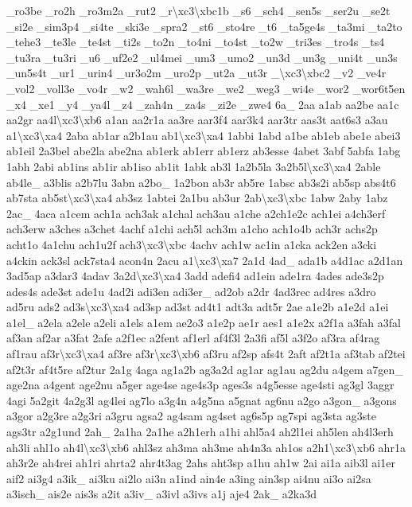 \begin{DoxyCompactItemize}
\-\_\-ro3be \-\_\-ro2h \-\_\-ro3m2a \-\_\-rut2 \-\_\-r\textbackslash{}xc3\textbackslash{}xbc1b \-\_\-s6 \-\_\-sch4 \-\_\-sen5s \-\_\-ser2u \-\_\-se2t \-\_\-si2e \-\_\-sim3p4 \-\_\-si4te \-\_\-ski3e \-\_\-spra2 \-\_\-st6 \-\_\-sto4re \-\_\-t6 \-\_\-ta5ge4s \-\_\-ta3mi \-\_\-ta2to \-\_\-tehe3 \-\_\-te3le \-\_\-te4st \-\_\-ti2s \-\_\-to2n \-\_\-to4ni \-\_\-to4st \-\_\-to2w \-\_\-tri3es \-\_\-tro4s \-\_\-ts4 \-\_\-tu3ra \-\_\-tu3ri \-\_\-u6 \-\_\-uf2e2 \-\_\-ul4mei \-\_\-um3 \-\_\-umo2 \-\_\-un3d \-\_\-un3g \-\_\-uni4t \-\_\-un3s \-\_\-un5s4t \-\_\-ur1 \-\_\-urin4 \-\_\-ur3o2m \-\_\-uro2p \-\_\-ut2a \-\_\-ut3r \-\_\-\textbackslash{}xc3\textbackslash{}xbc2 \-\_\-v2 \-\_\-ve4r \-\_\-vol2 \-\_\-voll3e \-\_\-vo4r \-\_\-w2 \-\_\-wah6l \-\_\-wa3re \-\_\-we2 \-\_\-weg3 \-\_\-wi4e \-\_\-wor2 \-\_\-wor6t5en \-\_\-x4 \-\_\-xe1 \-\_\-y4 \-\_\-ya4l \-\_\-z4 \-\_\-zah4n \-\_\-za4s \-\_\-zi2e \-\_\-zwe4 6a\-\_\- 2aa a1ab aa2be aa1c aa2gr aa4l\textbackslash{}xc3\textbackslash{}xb6 a1an aa2r1a aa3re aar3f4 aar3k4 aar3tr aas3t aat6s3 a3au a1\textbackslash{}xc3\textbackslash{}xa4 2aba ab1ar a2b1au ab1\textbackslash{}xc3\textbackslash{}xa4 1abbi 1abd a1be ab1eb abe1e abei3 ab1eil 2a3bel abe2la abe2na ab1erk ab1err ab1erz ab3esse 4abet 3abf 5abfa 1abg 1abh 2abi ab1ins ab1ir ab1iso ab1it 1abk ab3l 1a2b5la 3a2b5l\textbackslash{}xc3\textbackslash{}xa4 2able ab4le\-\_\- a3blis a2b7lu 3abn a2bo\-\_\- 1a2bon ab3r ab5re 1absc ab3s2i ab5sp abs4t6 ab7sta ab5st\textbackslash{}xc3\textbackslash{}xa4 ab3sz 1abtei 2a1bu ab3ur 2ab\textbackslash{}xc3\textbackslash{}xbc 1abw 2aby 1abz 2ac\-\_\- 4aca a1cem ach1a ach3ak a1chal ach3au a1che a2ch1e2c ach1ei a4ch3erf ach3erw a3ches a3chet 4achf a1chi ach5l ach3m a1cho ach1o4b ach3r achs2p acht1o 4a1chu ach1u2f ach3\textbackslash{}xc3\textbackslash{}xbc 4achv ach1w ac1in a1cka ack2en a3cki a4ckin ack3sl ack7sta4 acon4n 2acu a1\textbackslash{}xc3\textbackslash{}xa7 2a1d 4ad\-\_\- ada1b a4d1ac a2d1an 3ad5ap a3dar3 4adav 3a2d\textbackslash{}xc3\textbackslash{}xa4 3add adefi4 ad1ein ade1ra 4ades ade3s2p ades4s ade3st ade1u 4ad2i adi3en adi3er\-\_\- ad2ob a2dr 4ad3rec ad4res a3dro ad5ru ads2 ad3s\textbackslash{}xc3\textbackslash{}xa4 ad3sp ad3st ad4t1 adt3a adt5r 2ae a1e2b a1e2d a1ei a1el\-\_\- a2ela a2ele a2eli a1els a1em ae2o3 a1e2p ae1r aes1 a1e2x a2f1a a3fah a3fal af3an af2ar a3fat 2afe a2f1ec a2fent af1erl af4f3l 2a3fi af5l a3f2o af3ra af4rag af1rau af3r\textbackslash{}xc3\textbackslash{}xa4 af3re af3r\textbackslash{}xc3\textbackslash{}xb6 af3ru af2sp afs4t 2aft af2t1a af3tab af2tei af2t3r af4t5re af2tur 2a1g 4aga ag1a2b ag3a2d ag1ar ag1au ag2du a4gem a7gen\-\_\- age2na a4gent age2nu a5ger age4se age4s3p ages3s a4g5esse age4sti ag3gl 3aggr 4agi 5a2git 4a2g3l ag4lei ag7lo a3g4n a4g5na a5gnat ag6nu a2go a3gon\-\_\- a3gons a3gor a2g3re a2g3ri a3gru agsa2 ag4sam ag4set ag6s5p ag7spi ag3sta ag3ste ags3tr a2g1und 2ah\-\_\- 2a1ha 2a1he a2h1erh a1hi ahl5a4 ah2l1ei ah5len ah4l3erh ah3li ahl1o ah4l\textbackslash{}xc3\textbackslash{}xb6 ahl3sz ah3ma ah3me ah4n3a ah1os a2h1\textbackslash{}xc3\textbackslash{}xb6 ahr1a ah3r2e ah4rei ah1ri ahrta2 ahr4t3ag 2ahs aht3sp a1hu ah1w 2ai ai1a aib3l ai1er aif2 ai3g4 a3ik\-\_\- ai3ku ai2lo ai3n a1ind ain4e a3ing ain3sp ai4nu ai3o ai2sa a3isch\-\_\- ais2e ais3s a2it a3iv\-\_\- a3ivl a3ivs a1j aje4 2ak\-\_\- a2ka3d 
\end{DoxyCompactItemize}
